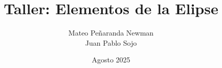 \documentclass{article}
\begin{document}
\title{Taller: Elementos de la Elipse}
\author{Mateo Peñaranda Newman \\ Juan Pablo Sojo}
\date{Agosto 2025}
\maketitle
\end{document}
